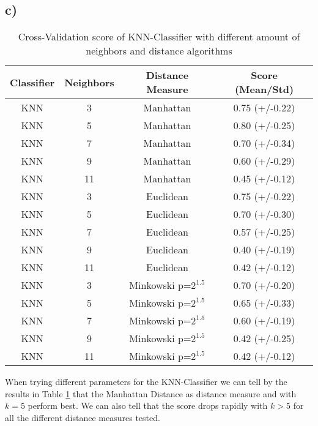 \documentclass{article}
\begin{document}
          \subsection{c)}
            \begin{table}[h]
              \label{tbl:task2c}
              \centering
              \begin{tabular}{cccc}
                \toprule
                Classifier &  Neighbors &       Distance Measure &           Score (Mean/Std)\\
                \midrule
                KNN &          3 &              Manhattan &  0.75 (+/-0.22) \\
                KNN &          5 &              Manhattan &  0.80 (+/-0.25) \\
                KNN &          7 &              Manhattan &  0.70 (+/-0.34) \\
                KNN &          9 &              Manhattan &  0.60 (+/-0.29) \\
                KNN &         11 &              Manhattan &  0.45 (+/-0.12) \\
                KNN &          3 &              Euclidean &  0.75 (+/-0.22) \\
                KNN &          5 &              Euclidean &  0.70 (+/-0.30) \\
                KNN &          7 &              Euclidean &  0.57 (+/-0.25) \\
                KNN &          9 &              Euclidean &  0.40 (+/-0.19) \\
                KNN &         11 &              Euclidean &  0.42 (+/-0.12) \\
                KNN &          3 &  Minkowski p=$2^{1.5}$ &  0.70 (+/-0.20) \\
                KNN &          5 &  Minkowski p=$2^{1.5}$ &  0.65 (+/-0.33) \\
                KNN &          7 &  Minkowski p=$2^{1.5}$ &  0.60 (+/-0.19) \\
                KNN &          9 &  Minkowski p=$2^{1.5}$ &  0.42 (+/-0.25) \\
                KNN &         11 &  Minkowski p=$2^{1.5}$ &  0.42 (+/-0.12) \\
                \bottomrule
              \end{tabular}
              \caption{Cross-Validation score of KNN-Classifier with different amount of neighbors and distance algorithms}
            \end{table}
            When trying different parameters for the KNN-Classifier we can tell by the results in Table \ref{tbl:task2c} that the Manhattan Distance as distance measure and with $k=5$ perform
            best. We can also tell that the score drops rapidly with $k > 5$ for all the different distance measures tested.
\end{document}
